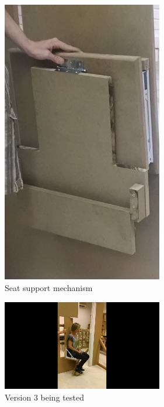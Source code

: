 \begin{figure}[h]
\centering
\includegraphics[width=7cm]{brazil_images/image033.jpg}
\caption{Seat support mechanism}
\label{fig:seat_support_mechanism}
\end{figure}

\begin{figure}[h]
\centering
\includegraphics[width=7cm]{brazil_images/image034.png}
\caption{Version 3 being tested}
\label{fig:version_3_usp}
\end{figure}

